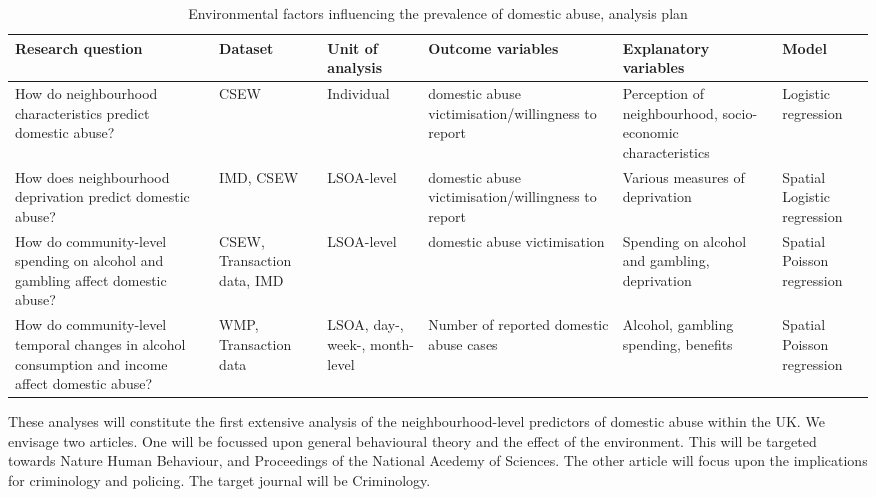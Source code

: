 \documentclass[11pt, a4paper]{article}
\newcommand{\AT}[1] {{\textcolor{blue}{#1}}}
\begin{document}
\begin{table}[!htbp]
\caption{Environmental factors influencing the prevalence of domestic abuse, analysis plan}
  \begin{threeparttable}[t]
  \centering
       \begin{tabular}{ L{4cm}  C{1.2cm}  C{1.6cm}  C{3cm}  C{2.8cm}  C{1.8cm} }
    \toprule
     \textbf{Research question} & \textbf{Dataset}    & \textbf{Unit of analysis} & \textbf{Outcome variables} & \textbf{Explanatory variables} & \textbf{Model} \\
    \midrule
    How do neighbourhood characteristics predict domestic abuse? & CSEW & Individual & domestic abuse victimisation/willingness to report & Perception of neighbourhood, socio-economic characteristics & Logistic regression \\
         \midrule
          How does neighbourhood deprivation predict domestic abuse? & IMD, CSEW & LSOA-level & domestic abuse victimisation/willingness to report & Various measures of deprivation & Spatial Logistic regression \\
         \midrule
          How do community-level spending on alcohol and gambling affect domestic abuse? & CSEW, Transaction data, IMD & LSOA-level & domestic abuse victimisation & Spending on alcohol and gambling, deprivation & Spatial Poisson regression \\
         \midrule
    How do community-level temporal changes in alcohol consumption and income affect domestic abuse? & WMP, Transaction data & LSOA, day-, week-, month-level & Number of reported domestic abuse cases & Alcohol, gambling spending, benefits & Spatial Poisson regression \\

     \bottomrule
  \end{tabular}
    \end{threeparttable}%
  \label{tab:addlabel}%
\end{table}%


These analyses will constitute the first extensive analysis of the neighbourhood-level predictors of domestic abuse within the UK. We envisage two articles. One will be focussed upon general behavioural theory and the effect of the environment. This will be targeted towards Nature Human Behaviour, and Proceedings of the National Acedemy of Sciences. The other article will focus upon the implications for criminology and policing. The target journal will be Criminology. 

\end{document}
